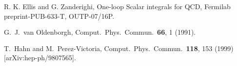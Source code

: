 \documentclass{article}
\begin{document}
\begin{thebibliography}{999}
R. K. Ellis and G. Zanderighi,
One-loop Scalar integrals for QCD,
Fermilab preprint-PUB-633-T, OUTP-07/16P.

  G.~J.~van Oldenborgh,
  Comput.\ Phys.\ Commun.\  {\bf 66}, 1 (1991).

  T.~Hahn and M.~Perez-Victoria,
  Comput.\ Phys.\ Commun.\  {\bf 118}, 153 (1999)
  [arXiv:hep-ph/9807565].


\end{thebibliography}
\end{document}
